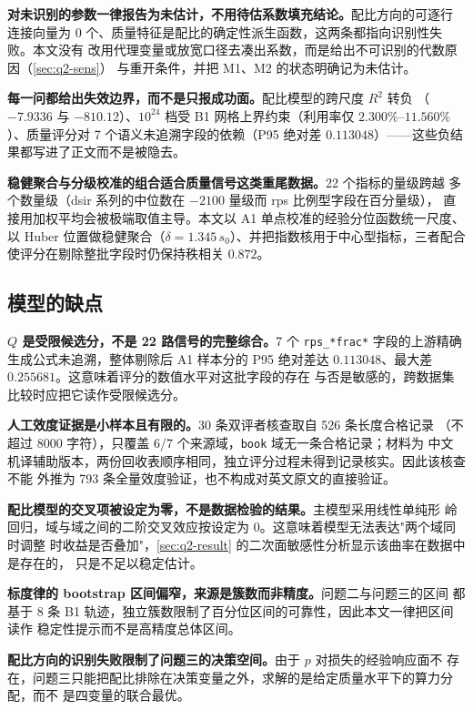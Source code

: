 \documentclass[bwprint]{gmcmthesis}
\numberwithin{equation}{section}
\numberwithin{figure}{section}
\numberwithin{table}{section}
\begin{document}
\textbf{对未识别的参数一律报告为未估计，不用待估系数填充结论。}配比方向的可逐行
连接向量为 0 个、质量特征是配比的确定性派生函数，这两条都指向识别性失败。本文没有
改用代理变量或放宽口径去凑出系数，而是给出不可识别的代数原因（\ref{sec:q2-sens}）
与重开条件，并把 M1、M2 的状态明确记为未估计。

\textbf{每一问都给出失效边界，而不是只报成功面。}配比模型的跨尺度 $R^2$ 转负
（$-7.9336$ 与 $-810.12$）、$10^{24}$ 档受 B1 网格上界约束（利用率仅
$2.300\%$--$11.560\%$）、质量评分对 7 个语义未追溯字段的依赖（P95 绝对差
$0.113048$）——这些负结果都写进了正文而不是被隐去。

\textbf{稳健聚合与分级校准的组合适合质量信号这类重尾数据。}22 个指标的量级跨越
多个数量级（dsir 系列的中位数在 $-2100$ 量级而 rps 比例型字段在百分量级），
直接用加权平均会被极端取值主导。本文以 A1 单点校准的经验分位函数统一尺度、以
Huber 位置做稳健聚合（$\delta=1.345\,s_0$）、并把指数核用于中心型指标，三者配合
使评分在剔除整批字段时仍保持秩相关 $0.872$。

\subsection{模型的缺点}

\textbf{$Q$ 是受限候选分，不是 22 路信号的完整综合。}7 个
\texttt{rps\_*frac*} 字段的上游精确生成公式未追溯，整体剔除后 A1 样本分的 P95
绝对差达 $0.113048$、最大差 $0.255681$。这意味着评分的数值水平对这批字段的存在
与否是敏感的，跨数据集比较时应把它读作受限候选分。

\textbf{人工效度证据是小样本且有限的。}30 条双评者核查取自 526 条长度合格记录
（不超过 8000 字符），只覆盖 6/7 个来源域，\texttt{book} 域无一条合格记录；材料为
中文机译辅助版本，两份回收表顺序相同，独立评分过程未得到记录核实。因此该核查不能
外推为 793 条全量效度验证，也不构成对英文原文的直接验证。

\textbf{配比模型的交叉项被设定为零，不是数据检验的结果。}主模型采用线性单纯形
岭回归，域与域之间的二阶交叉效应按设定为 0。这意味着模型无法表达"两个域同时调整
时收益是否叠加"，\ref{sec:q2-result} 的二次面敏感性分析显示该曲率在数据中是存在的，
只是不足以稳定估计。

\textbf{标度律的 bootstrap 区间偏窄，来源是簇数而非精度。}问题二与问题三的区间
都基于 8 条 B1 轨迹，独立簇数限制了百分位区间的可靠性，因此本文一律把区间读作
稳定性提示而不是高精度总体区间。

\textbf{配比方向的识别失败限制了问题三的决策空间。}由于 $p$ 对损失的经验响应面不
存在，问题三只能把配比排除在决策变量之外，求解的是给定质量水平下的算力分配，而不
是四变量的联合最优。
\end{document}
